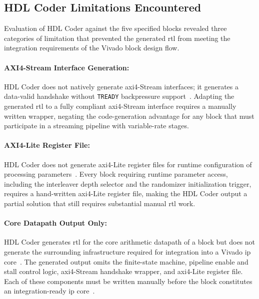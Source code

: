\subsection{HDL Coder Limitations Encountered}
\label{subsec:hdlcoder_limitations}

Evaluation of HDL Coder against the five specified blocks revealed
three categories of limitation that prevented the generated \ac{rtl}
from meeting the integration requirements of the Vivado block design
flow.

\paragraph{AXI4-Stream Interface Generation:}
HDL Coder does not natively generate \ac{axi}4-Stream interfaces;
it generates a data-valid handshake without \texttt{TREADY}
backpressure support~\cite{HDLCoder}.
Adapting the generated \ac{rtl} to a fully compliant \ac{axi}4-Stream
interface requires a manually written wrapper, negating the
code-generation advantage for any block that must participate in a
streaming pipeline with variable-rate stages.

\paragraph{AXI4-Lite Register File:}
HDL Coder does not generate \ac{axi}4-Lite register files for runtime
configuration of processing parameters~\cite{HDLCoder}.
Every block requiring runtime parameter access, including the
interleaver depth selector and the randomizer initialization trigger,
requires a hand-written \ac{axi}4-Lite register file, making the
HDL Coder output a partial solution that still requires substantial
manual \ac{rtl} work.

\paragraph{Core Datapath Output Only:}
HDL Coder generates \ac{rtl} for the core arithmetic datapath of a
block but does not generate the surrounding infrastructure required
for integration into a Vivado \ac{ip} core~\cite{HDLCoder}.
The generated output omits the finite-state machine, pipeline
enable and stall control logic, \ac{axi}4-Stream handshake wrapper,
and \ac{axi}4-Lite register file.
Each of these components must be written manually before the block
constitutes an integration-ready \ac{ip} core~\cite{HDLCoder}.


